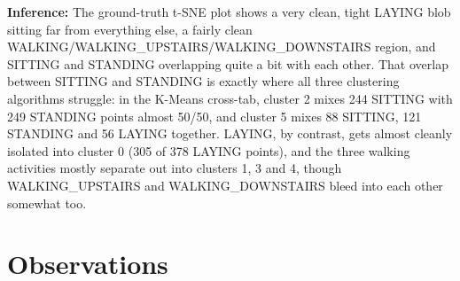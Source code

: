 \documentclass[12pt,a4paper]{article}
\begin{document}
\textbf{Inference:} The ground-truth t-SNE plot shows a very clean, tight LAYING blob sitting far from
everything else, a fairly clean WALKING/WALKING\_UPSTAIRS/WALKING\_DOWNSTAIRS region, and SITTING and
STANDING overlapping quite a bit with each other. That overlap between SITTING and STANDING is exactly
where all three clustering algorithms struggle: in the K-Means cross-tab, cluster 2 mixes 244 SITTING
with 249 STANDING points almost 50/50, and cluster 5 mixes 88 SITTING, 121 STANDING and 56 LAYING
together. LAYING, by contrast, gets almost cleanly isolated into cluster 0 (305 of 378 LAYING points),
and the three walking activities mostly separate out into clusters 1, 3 and 4, though
WALKING\_UPSTAIRS and WALKING\_DOWNSTAIRS bleed into each other somewhat too.

\section{Observations}
\end{document}
